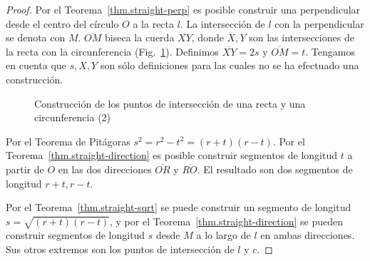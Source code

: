 \begin{proof}
Por el Teorema~\ref{thm.straight-perp} es posible construir una perpendicular desde el centro del círculo $O$ a la recta $l$. La intersección de $l$ con la perpendicular se denota con $M$. $\overline{OM}$ biseca la cuerda $\overline{XY}$, donde $X, Y$ son las intersecciones de la recta con la circunferencia (Fig.~\ref{f.se-line-circle2}). Definimos $\overline{XY}=2s$ y $\overline{OM}=t$. Tengamos en cuenta que $s,X,Y$ son sólo definiciones para las cuales no se ha efectuado una construcción.
\begin{figure}%
\begin{center}
\end{center}
\caption{Construcción de los puntos de intersección de una recta y una circunferencia (2)}\label{f.se-line-circle2}
\end{figure}

Por el Teorema de Pitágoras $s^2=r^2-t^2=(r+t)(r-t)$. Por el Teorema~\ref{thm.straight-direction} es posible construir segmentos de longitud $t$ a partir de $O$ en las dos direcciones $\overline{OR}$ y $\overline{RO}$. El resultado son dos segmentos de longitud $r+t,r-t$.

Por el Teorema~\ref{thm.straight-sqrt} se puede construir un segmento de longitud $s=\sqrt{(r+t)(r-t)}$, y por el Teorema~\ref{thm.straight-direction} se pueden construir segmentos de longitud $s$ desde $M$ a lo largo de $l$ en ambas direcciones. Sus otros extremos son los puntos de intersección de $l$ y $c$.
\end{proof}


